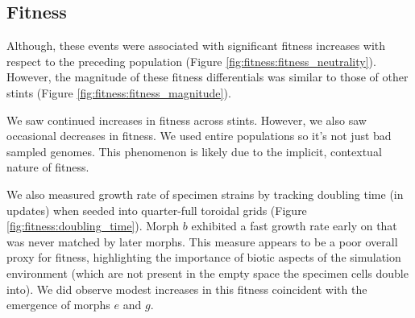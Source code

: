

\subsection{Fitness}



Although, these events were associated with significant fitness increases with respect to the preceding population (Figure \ref{fig:fitness:fitness_neutrality}).
However, the magnitude of these fitness differentials was similar to those of other stints (Figure \ref{fig:fitness:fitness_magnitude}).

We saw continued increases in fitness across stints.
However, we also saw occasional decreases in fitness.
We used entire populations so it's not just bad sampled genomes.
This phenomenon is likely due to the implicit, contextual nature of fitness.

We also measured growth rate of specimen strains by tracking doubling time (in updates) when seeded into quarter-full toroidal grids (Figure \ref{fig:fitness:doubling_time}).
Morph $b$ exhibited a fast growth rate early on that was never matched by later morphs.
This measure appears to be a poor overall proxy for fitness, highlighting the importance of biotic aspects of the simulation environment (which are not present in the empty space the specimen cells double into).
We did observe modest increases in this fitness coincident with the emergence of morphs $e$ and $g$.

